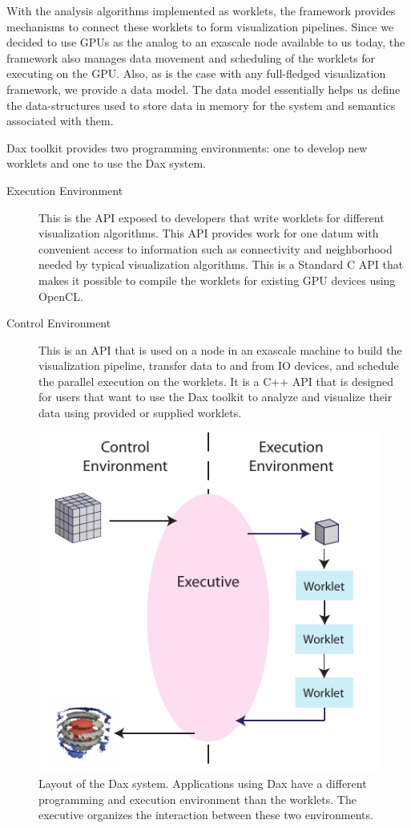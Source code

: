 \documentclass{vgtc}                          %
\begin{document}
With the analysis algorithms implemented as worklets, the framework provides 
mechanisms to connect these worklets to form visualization pipelines. Since we
decided to use GPUs as the analog to an exascale node available to us today, the
framework also manages data movement and scheduling of the worklets for
executing on the GPU. Also, as is the case with any full-fledged visualization
framework, we provide a data model. The data model essentially helps us
define the data-structures used to store data in memory for the system and
semantics associated with them.

Dax toolkit provides two programming environments: one to develop new worklets and one to use the Dax system.

\begin{description}
\item[Execution Environment] This is the API exposed to developers that
write worklets for different visualization algorithms. This API provides
work for one datum with convenient access to information such as
connectivity and neighborhood needed by typical visualization algorithms. This
is a Standard C API that makes it possible to compile the worklets for
existing GPU devices using OpenCL.
\item[Control Environment] This is an API that is used on a node in an
exascale machine to build the visualization pipeline, transfer data to and from
IO devices, and schedule the parallel execution on the worklets. It is a C++ API
that is designed for users that want to use the Dax toolkit to analyze and
visualize their data using provided or supplied worklets.
\end{description}

\begin{figure}
  \centering
  \includegraphics{images/DaxDiagram}
  \caption{Layout of the Dax system.
    Applications using Dax have a different programming and execution environment than the worklets.
    The executive organizes the interaction between these two environments.}
  \label{fig:DaxDiagram}
\end{figure}
\end{document}

